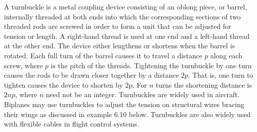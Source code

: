 \documentclass{AeroStructure-ERJohnson}
\begin{document}
A turnbuckle is a metal coupling device consisting of an oblong piece, or barrel, internally threaded at both ends into which the corresponding sections of two threaded rods are screwed in order to form a unit that can be adjusted for tension or length. A right-hand thread is used at one end and a left-hand thread at the other end. The device either lengthens or shortens when the barrel is rotated. Each full turn of the barrel causes it to travel a distance $p$ along each screw, where $p$ is the pitch of the threads. Tightening the turnbuckle by one turn causes the rods to be drawn closer together by a distance $2p$. That is, one turn to tighten causes the device to shorten by 2p. For $n$ turns the shortening distance is $2np$, where $n$ need not be an integer. Turnbuckles are widely used in aircraft. Biplanes may use turnbuckles to adjust the tension on structural wires bracing their wings as discussed in example 6.10 below. Turnbuckles are also widely used with flexible cables in flight control systems.
\end{document}
